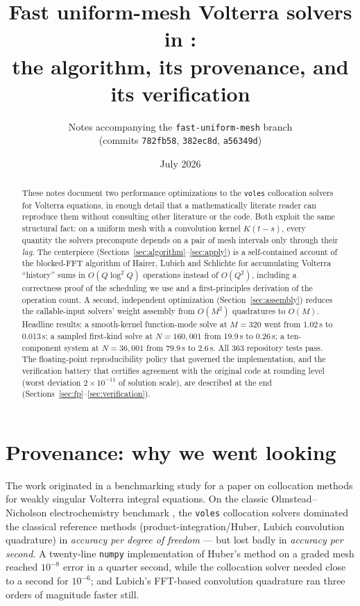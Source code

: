 \documentclass[11pt]{article}
\title{Fast uniform-mesh Volterra solvers in \voles:\\
the algorithm, its provenance, and its verification}
\author{Notes accompanying the \texttt{fast-uniform-mesh} branch\\
(commits \texttt{782fb58}, \texttt{382ec8d}, \texttt{a56349d})}
\date{July 2026}
\newcommand{\voles}{\texttt{voles}}
\begin{document}
\maketitle

\begin{abstract}
\noindent
These notes document two performance optimizations to the \voles{}
collocation solvers for Volterra equations, in enough detail that a
mathematically literate reader can reproduce them without consulting
other literature or the code. Both exploit the same structural fact: on a
uniform mesh with a convolution kernel $K(t-s)$, every quantity the
solvers precompute depends on a pair of mesh intervals only through their
\emph{lag}. The centerpiece (Sections~\ref{sec:algorithm}--\ref{sec:apply})
is a self-contained account of the blocked-FFT algorithm of Hairer,
Lubich and Schlichte for accumulating Volterra ``history'' sums in
$O(Q\log^2 Q)$ operations instead of $O(Q^2)$, including a correctness
proof of the scheduling we use and a first-principles derivation of the
operation count. A second, independent optimization
(Section~\ref{sec:assembly}) reduces the callable-input solvers' weight
assembly from $O(M^2)$ quadratures to $O(M)$. Headline results: a
smooth-kernel function-mode solve at $M=320$ went from 1.02\,s to
0.013\,s; a sampled first-kind solve at $N=160{,}001$ from 19.9\,s to
0.26\,s; a ten-component system at $N=36{,}001$ from 79.9\,s to 2.6\,s.
All 363 repository tests pass. The floating-point reproducibility policy
that governed the implementation, and the verification battery that
certifies agreement with the original code at rounding level (worst
deviation $2\times10^{-11}$ of solution scale), are described at the end
(Sections~\ref{sec:fp}--\ref{sec:verification}).
\end{abstract}

\tableofcontents

\section{Provenance: why we went looking}
\label{sec:provenance}

The work originated in a benchmarking study for a paper on collocation
methods for weakly singular Volterra integral equations. On the classic
Olmstead--Nicholson electrochemistry benchmark \cite{olmstead1968}, the
\voles{} collocation solvers dominated the classical reference methods
(product-integration/Huber, Lubich convolution quadrature) in
\emph{accuracy per degree of freedom} --- but lost badly in
\emph{accuracy per second}. A twenty-line \texttt{numpy} implementation
of Huber's method on a graded mesh reached $10^{-8}$ error in a quarter
second, while the collocation solver needed close to a second for
$10^{-6}$; and Lubich's FFT-based convolution quadrature ran three orders
of magnitude faster still.
\end{document}

